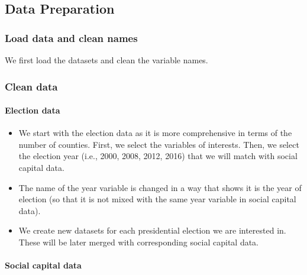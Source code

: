 \documentclass[
  english,
  man]{apa6}
\let\oldparagraph\paragraph
\renewcommand{\paragraph}[1]{\oldparagraph{#1}\mbox{}}
\begin{document}
\hypertarget{data-preparation}{%
\subsection{Data Preparation}\label{data-preparation}}

\hypertarget{load-data-and-clean-names}{%
\subsubsection{Load data and clean names}\label{load-data-and-clean-names}}

We first load the datasets and clean the variable names.

\hypertarget{clean-data}{%
\subsubsection{Clean data}\label{clean-data}}

\hypertarget{election-data}{%
\paragraph{Election data}\label{election-data}}

\begin{itemize}
\item
  We start with the election data as it is more comprehensive in terms of the number of counties. First, we select the variables of interests. Then, we select the election year (i.e., 2000, 2008, 2012, 2016) that we will match with social capital data.
\item
  The name of the year variable is changed in a way that shows it is the year of election (so that it is not mixed with the same year variable in social capital data).
\item
  We create new datasets for each presidential election we are interested in. These will be later merged with corresponding social capital data.
\end{itemize}

\hypertarget{social-capital-data}{%
\paragraph{Social capital data}\label{social-capital-data}}
\end{document}
